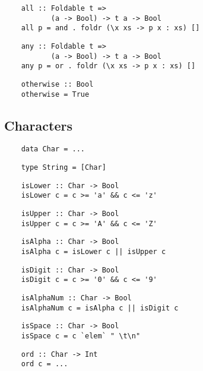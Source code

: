 \begin{multicols}{2}
	\begin{verbatim}
	all :: Foldable t => 
	       (a -> Bool) -> t a -> Bool
	all p = and . foldr (\x xs -> p x : xs) []
	\end{verbatim}
	
	\begin{verbatim}
	any :: Foldable t => 
	       (a -> Bool) -> t a -> Bool
	any p = or . foldr (\x xs -> p x : xs) []
	\end{verbatim}
	
	\begin{verbatim}
	otherwise :: Bool
	otherwise = True
	\end{verbatim}
	
	\subsection*{Characters} 
	
	\begin{verbatim}
	data Char = ...
	\end{verbatim}
	
	\begin{verbatim}
	type String = [Char]
	\end{verbatim}
	
	\begin{verbatim}
	isLower :: Char -> Bool 
	isLower c = c >= 'a' && c <= 'z'
	\end{verbatim}
	
	\begin{verbatim}
	isUpper :: Char -> Bool 
	isUpper c = c >= 'A' && c <= 'Z'
	\end{verbatim}
	
	\begin{verbatim}
	isAlpha :: Char -> Bool 
	isAlpha c = isLower c || isUpper c
	\end{verbatim}
	
	\begin{verbatim}
	isDigit :: Char -> Bool 
	isDigit c = c >= '0' && c <= '9'
	\end{verbatim}
	
	\begin{verbatim}
	isAlphaNum :: Char -> Bool 
	isAlphaNum c = isAlpha c || isDigit c
	\end{verbatim}
	
	\begin{verbatim}
	isSpace :: Char -> Bool 
	isSpace c = c `elem` " \t\n"
	\end{verbatim}
	
	\begin{verbatim}
	ord :: Char -> Int 
	ord c = ...
	\end{verbatim}
	

\end{multicols}
